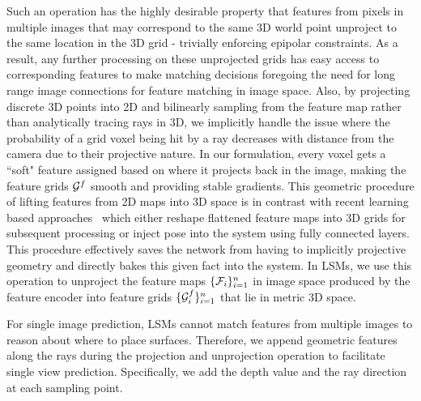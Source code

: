 \documentclass[../thesis.tex]{subfiles}
\begin{document}
Such an operation has the highly desirable property that features from pixels in multiple images that may correspond to the same 3D world point unproject to the same location in the 3D grid - trivially enforcing epipolar constraints. As a result, any further processing on these unprojected grids has easy access to corresponding features to make matching decisions foregoing the need for long range image connections for feature matching in image space. Also, by projecting discrete 3D points into 2D and bilinearly sampling from the feature map rather than analytically tracing rays in 3D, we implicitly handle the issue where the probability of a grid voxel being hit by a ray decreases with distance from the camera due to their projective nature. In our formulation, every voxel gets a ``soft" feature assigned based on where it projects back in the image, making the feature grids $\mathcal{G}^f$ smooth and providing stable gradients. This geometric procedure of lifting features from 2D maps into 3D space is in contrast with recent learning based approaches~\cite{choy20163d,tatarchenko2016multi} which either reshape flattened feature maps into 3D grids for subsequent processing or inject pose into the system using fully connected layers. This procedure effectively saves the network from having to implicitly  projective geometry and directly bakes this given fact into the system. In LSMs, we use this operation to unproject the feature maps $\{\mathcal{F}_i\}_{i=1}^n$ in image space produced by the feature encoder into feature grids $\{\mathcal{G}^f_i\}_{i=1}^n$ that lie in metric 3D space.

For single image prediction, LSMs cannot match features from multiple images to reason about where to place surfaces. Therefore, we append geometric features along the rays during the projection and unprojection operation to facilitate single view prediction. Specifically, we add the depth value and the ray direction at each sampling point.
\end{document}
